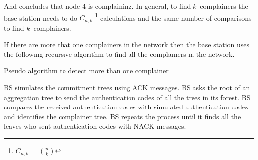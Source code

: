 		And concludes that node $4 $ is complaining.
		In general, to find $k$\ complainers the base station needs to do $C_{n,k}$ \footnote{$C_{n,k}$ = $ n \choose k$} calculations and the same number of comparisons to find $k$\ complainers.

		If there are more that one complainers in the network then the base station uses the following recursive algorithm to find all the complainers in the network.
		\begin{algorithm}
			\caption{Pseudo algorithm to detect more than one complainer}
			\label{algo:detect-a-complainer}
			\begin{algorithmic}[1]

				\STATE BS simulates the commitment trees using ACK messages.
				\STATE BS asks the root of an aggregation tree to send the authentication codes of all the trees in its forest.
				\STATE BS compares the received authentication codes with simulated authentication codes and identifies the complainer tree.
				\STATE BS repeats the process until it finds all the leaves who sent authentication codes with NACK messages. 
			\end{algorithmic}
		\end{algorithm}

